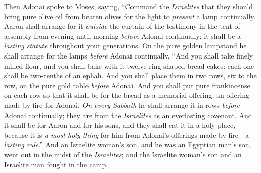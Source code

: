 \begin{biblechapter} %
 Then Adonai spoke to Moses, saying,
\verse “Command the \textit{Israelites} that they should bring pure olive oil from beaten olives for the light to \textit{present} a lamp continually.
\verse Aaron shall arrange for it \textit{outside} the curtain of the testimony in the tent of assembly from evening until morning \textit{before} Adonai continually; it shall be a \textit{lasting statute} throughout your generations.
\verse On the pure golden lampstand he shall arrange for the lamps \textit{before} Adonai continually.
\verse “And you shall take finely milled flour, and you shall bake with it twelve ring-shaped bread cakes: each one shall be two-tenths of an ephah.
\verse And you shall place them in two rows, six to the row, on the pure gold table \textit{before} Adonai.
\verse And you shall put pure frankincense on each row so that it shall be for the bread as a memorial offering, an offering made by fire for Adonai.
\verse \textit{On every Sabbath} he shall arrange it in rows \textit{before} Adonai continually; they are from the \textit{Israelites} as an everlasting covenant.
\verse And it shall be for Aaron and for his sons, and they shall eat it in a holy place, because it is \textit{a most holy thing} for him from Adonai’s offerings made by fire—a \textit{lasting rule}.”
 And an Israelite woman’s son, and he was an Egyptian man’s son, went out in the midst of the \textit{Israelites}; and the Israelite woman’s son and an Israelite man fought in the camp.

\end{biblechapter}
